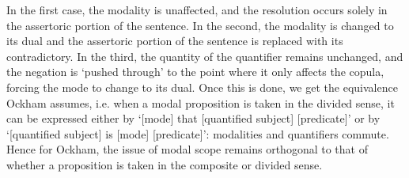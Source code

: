 \documentclass[a4paper]{article}
\begin{document}
In the first case, the modality is unaffected, and the resolution occurs solely in the assertoric portion of the sentence. In the second, the modality is changed to its dual and the assertoric portion of the sentence is replaced with its contradictory. In the third, the quantity of the quantifier remains unchanged, and the negation is `pushed through' to the point where it only affects the copula, forcing the mode to change to its dual. Once this is done, we get the equivalence Ockham assumes, i.e.  when a modal proposition is taken in the divided sense, it can be expressed either by `[mode] that [quantified subject] [predicate]' or by `[quantified subject] is [mode] [predicate]': modalities and quantifiers commute. Hence for Ockham, the issue of modal scope remains orthogonal to that of whether a proposition is taken in the composite or divided sense.
\end{document}
